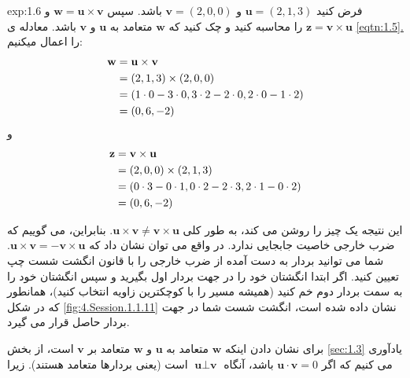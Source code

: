 {\begin{spacing}{1.5}
        \begin{example}{exp:1.6}
            فرض کنید $\textbf{u}=(2,1,3)$ و $\textbf{v}=(2,0,0)$ باشد. سپس $\textbf{w}=\textbf{u}\times\textbf{v}$ و $\textbf{z}=\textbf{v}\times\textbf{u}$ را محاسبه کنید و چک کنید که $\textbf{w}$ متعامد به $\textbf{u}$ و $\textbf{v}$ باشد. معادله ی \hyperref[eqtn:1.5]{\ref{eqtn:1.5}.} را اعمال میکنیم: \\
            \begin{equation*}
                \centering
                \begin{split}
                    \textbf{w}&=\textbf{u}\times\textbf{v}\\
                    &=(2,1,3)\times(2,0,0)\\
                    &=(1\cdot 0-3\cdot 0, 3\cdot 2-2\cdot 0, 2\cdot 0-1\cdot 2)\\
                    &=(0,6,-2)
                \end{split}
            \end{equation*}
            و
            \begin{equation*}
                \centering
                \begin{split}
                    \textbf{z}&=\textbf{v}\times\textbf{u}\\
                    &=(2,0,0)\times(2,1,3)\\
                    &=(0\cdot 3-0\cdot 1, 0\cdot 2-2\cdot 3, 2\cdot 1-0\cdot 2)\\
                    &=(0,6,-2)
                \end{split}
            \end{equation*}

            این نتیجه یک چیز را روشن می کند، به طور کلی $\textbf{u}\times\textbf{v}\neq\textbf{v}\times\textbf{u}$. بنابراین، می گوییم که ضرب خارجی خاصیت جابجایی ندارد.
            در واقع می توان نشان داد که $\textbf{u}\times\textbf{v}=-\textbf{v}\times\textbf{u}$. شما می توانید بردار به دست آمده از ضرب خارجی را با قانون انگشت شست چپ تعیین کنید.
            اگر ابتدا انگشتان خود را در جهت بردار اول بگیرید و سپس انگشتان خود را به سمت بردار دوم خم کنید (همیشه مسیر را با کوچکترین زاویه انتخاب کنید)، همانطور که در شکل \ref{fig:4.Session.1.1.11} نشان داده شده است، انگشت شست شما در جهت بردار حاصل قرار می گیرد.

            برای نشان دادن اینکه $\textbf{w}$ متعامد به $\textbf{u}$ و $\textbf{w}$ متعامد بر $\textbf{v}$ است،
            از بخش \ref{sec:1.3} یادآوری می کنیم که اگر $\textbf{u}\cdot\textbf{v}=0$ باشد،
            آنگاه $\textbf{u}\perp\textbf{v}$ است (یعنی بردارها متعامد هستند). زیرا


\end{example}
\end{spacing}}

